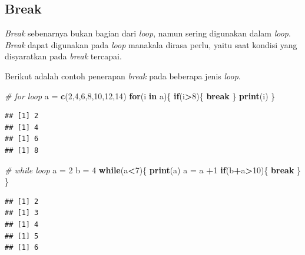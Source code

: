 \documentclass[
]{book}
\newenvironment{Shaded}{\begin{snugshade}}{\end{snugshade}}
\newcommand{\CommentTok}[1]{\textcolor[rgb]{0.56,0.35,0.01}{\textit{#1}}}
\newcommand{\ControlFlowTok}[1]{\textcolor[rgb]{0.13,0.29,0.53}{\textbf{#1}}}
\newcommand{\DecValTok}[1]{\textcolor[rgb]{0.00,0.00,0.81}{#1}}
\newcommand{\FunctionTok}[1]{\textcolor[rgb]{0.13,0.29,0.53}{\textbf{#1}}}
\newcommand{\NormalTok}[1]{#1}
\newcommand{\OtherTok}[1]{\textcolor[rgb]{0.56,0.35,0.01}{#1}}
\newcommand{\SpecialCharTok}[1]{\textcolor[rgb]{0.81,0.36,0.00}{\textbf{#1}}}
\theoremstyle{definition}
\theoremstyle{definition}
\theoremstyle{definition}
\theoremstyle{definition}
\theoremstyle{remark}
\begin{document}
\hypertarget{break}{%
\subsection{Break}\label{break}}

\emph{Break} sebenarnya bukan bagian dari \emph{loop}, namun sering digunakan dalam \emph{loop}. \emph{Break} dapat digunakan pada \emph{loop} manakala dirasa perlu, yaitu saat kondisi yang disyaratkan pada \emph{break} tercapai.

Berikut adalah contoh penerapan \emph{break} pada beberapa jenis \emph{loop}.

\begin{Shaded}
\begin{Highlighting}[]
\CommentTok{\# for loop}
\NormalTok{a }\OtherTok{=} \FunctionTok{c}\NormalTok{(}\DecValTok{2}\NormalTok{,}\DecValTok{4}\NormalTok{,}\DecValTok{6}\NormalTok{,}\DecValTok{8}\NormalTok{,}\DecValTok{10}\NormalTok{,}\DecValTok{12}\NormalTok{,}\DecValTok{14}\NormalTok{)}
\ControlFlowTok{for}\NormalTok{(i }\ControlFlowTok{in}\NormalTok{ a)\{}
  \ControlFlowTok{if}\NormalTok{(i}\SpecialCharTok{\textgreater{}}\DecValTok{8}\NormalTok{)\{}
    \ControlFlowTok{break}
\NormalTok{  \}}
  \FunctionTok{print}\NormalTok{(i)}
\NormalTok{\}}
\end{Highlighting}
\end{Shaded}

\begin{verbatim}
## [1] 2
## [1] 4
## [1] 6
## [1] 8
\end{verbatim}

\begin{Shaded}
\begin{Highlighting}[]
\CommentTok{\# while loop}
\NormalTok{a }\OtherTok{=} \DecValTok{2}
\NormalTok{b }\OtherTok{=} \DecValTok{4}
\ControlFlowTok{while}\NormalTok{(a}\SpecialCharTok{\textless{}}\DecValTok{7}\NormalTok{)\{}
  \FunctionTok{print}\NormalTok{(a)}
\NormalTok{  a }\OtherTok{=}\NormalTok{ a }\SpecialCharTok{+}\DecValTok{1}
  \ControlFlowTok{if}\NormalTok{(b}\SpecialCharTok{+}\NormalTok{a}\SpecialCharTok{\textgreater{}}\DecValTok{10}\NormalTok{)\{}
    \ControlFlowTok{break}
\NormalTok{  \}}
\NormalTok{\}}
\end{Highlighting}
\end{Shaded}

\begin{verbatim}
## [1] 2
## [1] 3
## [1] 4
## [1] 5
## [1] 6
\end{verbatim}
\end{document}
